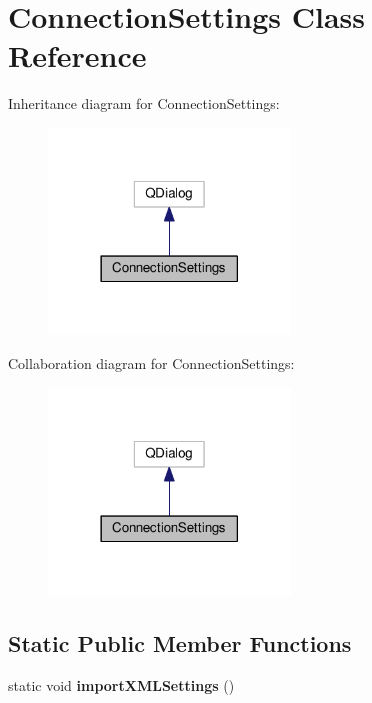 \hypertarget{classConnectionSettings}{\section{Connection\+Settings Class Reference}
\label{classConnectionSettings}
}


Inheritance diagram for Connection\+Settings\+:\nopagebreak
\begin{figure}[H]
\begin{center}
\leavevmode
\includegraphics[width=182pt]{classConnectionSettings__inherit__graph}
\end{center}
\end{figure}


Collaboration diagram for Connection\+Settings\+:\nopagebreak
\begin{figure}[H]
\begin{center}
\leavevmode
\includegraphics[width=182pt]{classConnectionSettings__coll__graph}
\end{center}
\end{figure}
\subsection*{Static Public Member Functions}
\begin{DoxyCompactItemize}
\item 
\hypertarget{classConnectionSettings_a6a2336ec802e7759fe6ed7ed8a4e736b}{static void {\bfseries import\+X\+M\+L\+Settings} ()}\label{classConnectionSettings_a6a2336ec802e7759fe6ed7ed8a4e736b}

\end{DoxyCompactItemize}

